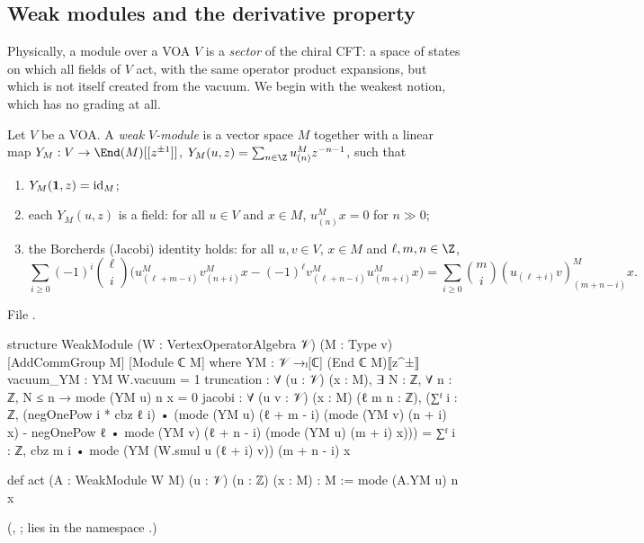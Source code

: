 \subsection{Weak modules and the derivative property}

Physically, a module over a VOA $V$ is a \emph{sector} of the chiral CFT: a space of states on which all fields of
$V$ act, with the same operator product expansions, but which is not itself created from the vacuum. We begin with the
weakest notion, which has no grading at all.

\begin{definition}\label{l12:def:weakmodule}
Let $V$ be a VOA. A \emph{weak $V$-module} is a vector space $M$ together with a linear map
$Y_M:V\to\End(M)[[z^{\pm1}]]$, $Y_M(u,z) = \sum_{n\in\Z}u^M_{(n)}z^{-n-1}$, such that
\begin{enumerate}[label=(M\arabic*)]
\item $Y_M(\mathbf{1},z) = \mathrm{id}_M$;
\item each $Y_M(u,z)$ is a field: for all $u\in V$ and $x\in M$, $u^M_{(n)}x = 0$ for $n\gg0$;
\item the Borcherds (Jacobi) identity holds: for all $u,v\in V$, $x\in M$ and $\ell,m,n\in\Z$,
\begin{equation*}
 \sum_{i\ge0}(-1)^i\binom\ell i\Big(u^M_{(\ell+m-i)}v^M_{(n+i)}x - (-1)^\ell v^M_{(\ell+n-i)}u^M_{(m+i)}x\Big)
 = \sum_{i\ge0}\binom mi(u_{(\ell+i)}v)^M_{(m+n-i)}x .
\end{equation*}
\end{enumerate}
\end{definition}
\noindent File .
\begin{leancode}
structure WeakModule (W : VertexOperatorAlgebra 𝒱) (M : Type v)
    [AddCommGroup M] [Module ℂ M] where
  YM : 𝒱 →ₗ[ℂ] (End ℂ M)⟦z^±⟧
  vacuum_YM : YM W.vacuum = 1
  truncation : ∀ (u : 𝒱) (x : M), ∃ N : ℤ, ∀ n : ℤ, N ≤ n → mode (YM u) n x = 0
  jacobi : ∀ (u v : 𝒱) (x : M) (ℓ m n : ℤ),
    (∑ᶠ i : ℤ, (negOnePow i * cbz ℓ i) •
        (mode (YM u) (ℓ + m - i) (mode (YM v) (n + i) x)
          - negOnePow ℓ • mode (YM v) (ℓ + n - i) (mode (YM u) (m + i) x)))
      = ∑ᶠ i : ℤ, cbz m i • mode (YM (W.smul u (ℓ + i) v)) (m + n - i) x

def act (A : WeakModule W M) (u : 𝒱) (n : ℤ) (x : M) : M := mode (A.YM u) n x
\end{leancode}
(, ;  lies in the namespace .)

